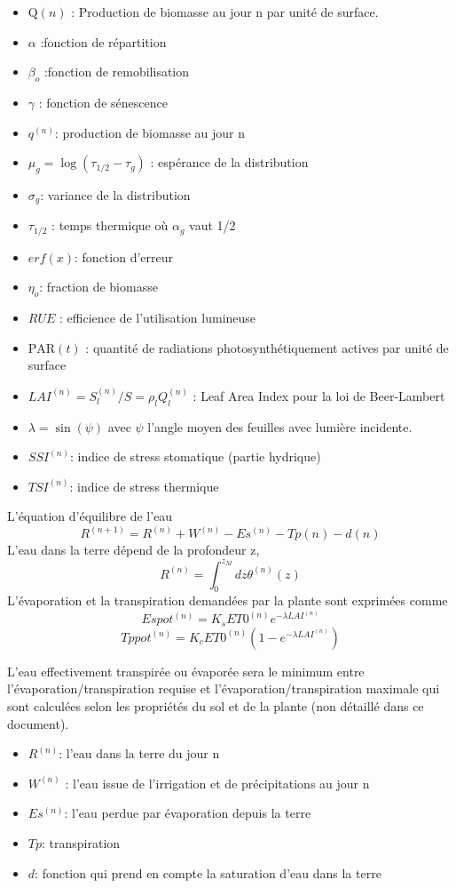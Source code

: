 \begin{itemize}
\item $\mathrm{Q}(n)$ : Production de biomasse au jour n par unité de surface.
\item $\alpha$  :fonction de répartition
\item $\beta_o$  :fonction de remobilisation
\item $\gamma$ : fonction de sénescence
\item $q^{(n)}$: production de biomasse au jour n 
\item $\mu_g=\log (\tau_{1/2}-\tau_g)$ : espérance de la distribution
\item $\sigma_g$: variance de la distribution
\item $\tau_{1/2}$ : temps thermique où $\alpha_g$ vaut 1/2
\item $erf(x)$: fonction d'erreur
\item $\eta_o$: fraction de biomasse 
\item $RUE$ : efficience de l'utilisation lumineuse
\item $\mathrm{PAR}(t)$ : quantité de radiations photosynthétiquement actives par unité de surface
\item $LAI^{(n)} = S^{(n)}_l/S = \rho_l Q^{(n)}_l $ : Leaf Area Index pour la loi de Beer-Lambert 
\item $\lambda = \sin(\psi)$ avec $\psi$ l'angle moyen des feuilles avec lumière incidente. 
\item $SSI^{(n)}$: indice de stress stomatique (partie hydrique)
\item $TSI^{(n)}$: indice de stress thermique
\end{itemize}
L'équation d'équilibre de l'eau
\[ {R^{(n+1)}}=R^{(n)}+W^{(n)}-Es^{(n)}-Tp{(n)}-d{(n)}\]
L'eau dans la terre dépend de la profondeur z,
\[ {R^{(n)}}=\int_0^{z_M}dz \theta^{(n)}(z) \]
L'évaporation et la transpiration demandées par la plante sont exprimées comme
\[ {Espot^{(n)}}=K_sET0^{(n)}e^{-\lambda LAI^{(n)}}\]
\[ {Tppot^{(n)}}=K_cET0^{(n)}(1-e^{-\lambda LAI^{(n)}})\]

L'eau effectivement transpirée ou évaporée sera le minimum  entre l'évaporation/transpiration requise et l'évaporation/transpiration maximale qui sont calculées selon les propriétés du sol et de la plante (non détaillé dans ce document).

\begin{itemize}
\item $R^{(n)}$: l'eau dans la terre du jour n
\item $W^{(n)}$ : l'eau issue de l'irrigation et de  précipitations au jour n
\item $Es^{(n)}$: l'eau perdue par évaporation depuis la terre
\item $Tp$: transpiration
\item $d$: fonction qui prend en compte la saturation d'eau dans la terre
\end{itemize}